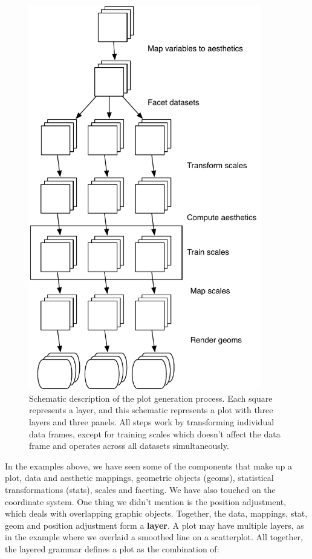 \begin{figure}[htbp]
  \centering
  \includegraphics[width=4in]{diagrams/mastery-schema}
  \caption{Schematic description of the plot generation process. Each square represents a layer, and this schematic represents a plot with three layers and three panels. All steps work by transforming individual data frames, except for training scales which doesn't affect the data frame and operates across all datasets simultaneously.}
  \label{fig:schematic}
\end{figure}


In the examples above, we have seen some of the components that make up
a plot, data and aesthetic mappings, geometric objects (geoms),
statistical transformations (stats), scales and faceting. We have also
touched on the coordinate system. One thing we didn't mention is the
position adjustment, which deals with overlapping graphic objects.
Together, the data, mappings, stat, geom and position adjustment form a
\textbf{layer}. A plot may have multiple layers, as in the example where
we overlaid a smoothed line on a scatterplot. All together, the layered
grammar defines a plot as the combination of: 

